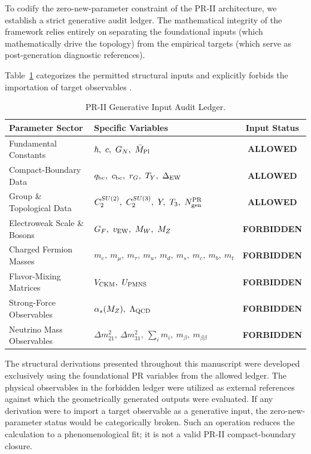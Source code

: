 \documentclass[11pt]{article}
\renewcommand{\arraystretch}{1.22}
\renewcommand{\arraystretch}{1.4}
\begin{document}
To codify the zero-new-parameter constraint of the PR-II architecture, we establish a strict generative audit ledger. The mathematical integrity of the framework relies entirely on separating the foundational inputs (which mathematically drive the topology) from the empirical targets (which serve as post-generation diagnostic references). 

Table~\ref{tab:pr2_input_discipline} categorizes the permitted structural inputs and explicitly forbids the importation of target observables \cite{TiesingaCODATA2021}.

\begin{table}[ht!]
\centering
\caption{PR-II Generative Input Audit Ledger.}
\label{tab:pr2_input_discipline}
\small
\renewcommand{\arraystretch}{1.3}
\begin{tabular}{llc}
\hline\hline
\textbf{Parameter Sector} & \textbf{Specific Variables} & \textbf{Input Status} \\ \hline
Fundamental Constants & $\hbar,\ c,\ G_N,\ \bar M_{\rm Pl}$ & \textbf{ALLOWED} \\
Compact-Boundary Data & $q_{\rm bc},\ c_{\rm bc},\ r_G,\ T_Y,\ \Delta_{\rm EW}$ & \textbf{ALLOWED} \\
Group \& Topological Data & $C_2^{SU(2)},\ C_2^{SU(3)},\ Y,\ T_3,\ N_{\rm gen}^{\rm PR}$ & \textbf{ALLOWED} \\ \hline
Electroweak Scale \& Bosons & $G_F,\ v_{\rm EW},\ M_W,\ M_Z$ & \textbf{FORBIDDEN} \\
Charged Fermion Masses & $m_e,\ m_\mu,\ m_\tau,\ m_u,\ m_d,\ m_s,\ m_c,\ m_b,\ m_t$ & \textbf{FORBIDDEN} \\
Flavor-Mixing Matrices & $V_{\rm CKM},\ U_{\rm PMNS}$ & \textbf{FORBIDDEN} \\
Strong-Force Observables & $\alpha_s(M_Z),\ \Lambda_{\rm QCD}$ & \textbf{FORBIDDEN} \\
Neutrino Mass Observables & $\Delta m_{21}^2,\ \Delta m_{31}^2,\ \sum_i m_i,\ m_\beta,\ m_{\beta\beta}$ & \textbf{FORBIDDEN} \\ \hline\hline
\end{tabular}
\end{table}

The structural derivations presented throughout this manuscript were developed exclusively using the foundational PR variables from the allowed ledger. The physical observables in the forbidden ledger were utilized as external references \cite{PDG2024} against which the geometrically generated outputs were evaluated. If any derivation were to import a target observable as a generative input, the zero-new-parameter status would be categorically broken. Such an operation reduces the calculation to a phenomenological fit; it is not a valid PR-II compact-boundary closure.
\end{document}
